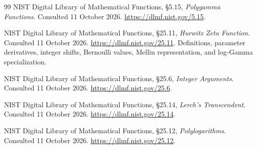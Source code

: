 \documentclass[11pt,letterpaper]{article}
\numberwithin{equation}{section}
\theoremstyle{definition}\newtheorem{definition}[theorem]{Definition}
\theoremstyle{remark}\newtheorem{remark}[theorem]{Remark}
\begin{document}
\begin{thebibliography}{99}
NIST Digital Library of Mathematical Functions, \S5.15,
\emph{Polygamma Functions}. Consulted 11 October 2026.
\url{https://dlmf.nist.gov/5.15}.

NIST Digital Library of Mathematical Functions, \S25.11,
\emph{Hurwitz Zeta Function}. Consulted 11 October 2026.
\url{https://dlmf.nist.gov/25.11}.
Definitions, parameter derivatives, integer shifts, Bernoulli values,
Mellin representation, and log-Gamma specialization.

NIST Digital Library of Mathematical Functions, \S25.6,
\emph{Integer Arguments}. Consulted 11 October 2026.
\url{https://dlmf.nist.gov/25.6}.

NIST Digital Library of Mathematical Functions, \S25.14,
\emph{Lerch's Transcendent}. Consulted 11 October 2026.
\url{https://dlmf.nist.gov/25.14}.

NIST Digital Library of Mathematical Functions, \S25.12,
\emph{Polylogarithms}. Consulted 11 October 2026.
\url{https://dlmf.nist.gov/25.12}.
\end{thebibliography}
\end{document}
